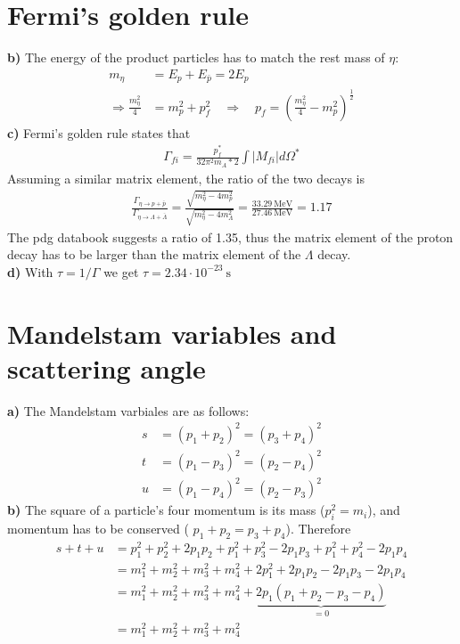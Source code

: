 \documentclass{article}
\begin{document}
\section{Fermi's golden rule}
\textbf{b)} The energy of the product particles has to match the rest mass of
\( \eta \):
\begin{align}
    m_ \eta &= E_p + E _{\bar p} = 2 E_p \nonumber \\
    \Rightarrow \frac{m_\eta^2}{4} &= m_p^2 + p_f^2 \quad
    \Rightarrow \quad p_f = \left(\frac{m_\eta^2}{4} - m_p^2 \right) ^{\frac{1}{2}}
\end{align}
\textbf{c)} Fermi's golden rule states that
\begin{align}
\Gamma _{fi} = \frac{p_f^{*}}{32 \pi ^2 m_A*2} \int \left| M_{fi} \right| d \Omega^{*}
\end{align}
Assuming a similar matrix element, the ratio of the two decays is 
\begin{align}
    \frac{\Gamma _{\eta \rightarrow p + \bar p}}{\Gamma _{\eta \rightarrow \Lambda + \bar \Lambda}}
	= \frac{\sqrt{m _{\eta}^2-4m_p^2} }{\sqrt{m _{\eta}^2-4m_\Lambda^2} }
	= \frac{33.29 \ \si{\mega \electronvolt}}{27.46 \ \si{\mega \electronvolt}} = 1.17
\end{align}
The pdg databook suggests a ratio of 1.35, thus the matrix element of the proton
decay has to be larger than the matrix element of the \( \Lambda \) decay. \\
\textbf{d)} With \( \tau = 1/\Gamma \) we get \( \tau = 2.34 \cdot 10 ^{-23} \ \si{\second} \)

\section{Mandelstam variables and scattering angle}
\textbf{a)} The Mandelstam varbiales are as follows:
\begin{align}
    s &= \left( p_1 + p_2 \right) ^2 = \left( p_3 + p_4 \right) ^2 \\
    t &= \left( p_1 - p_3 \right) ^2 = \left( p_2 - p_4 \right) ^2 \\
    u &= \left( p_1 - p_4 \right) ^2 = \left( p_2 - p_3 \right) ^2 
\end{align}
\textbf{b)} The square of a particle's four momentum is its mass (\(p_i^2 = m_i\)), and momentum
has to be conserved ( \( p_1 +p_2 = p_3 + p_4 \)). Therefore
\begin{align}
\nonumber s+t+u &= p_1^2+p_2^2+2p_1p_2 + p_1^2+p_3^2-2p_1p_3+p_1^2+p_4^2-2p_1p_4 \\
\nonumber&= m_1^2+m_2^2+m_3^2+m_4^2+2p_1^2+2p_1p_2-2p_1p_3-2p_1p_4 \\
\nonumber&= m_1^2+m_2^2+m_3^2+m_4^2+\underbrace{2p_1(p_1+p_2-p_3-p_4)}_{=0}\\
&= m_1^2+m_2^2+m_3^2+m_4^2
\end{align}
\end{document}
